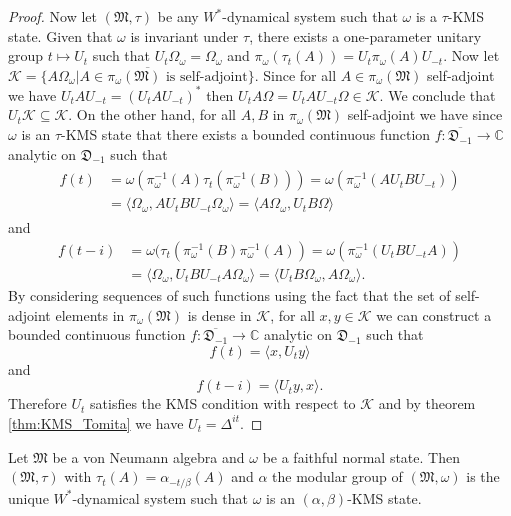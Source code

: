 \begin{proof}
Now let $(\mathfrak{M},\tau)$ be any $W^*$-dynamical system such that $\omega$ is a $\tau$-KMS state. Given that $\omega$ is invariant under $\tau$, there exists a one-parameter unitary group $t\mapsto U_t$ such that $U_t\Omega_\omega=\Omega_\omega$ and $\pi_\omega(\tau_t(A))=U_t\pi_\omega(A)U_{-t}$. Now let $\mathcal{K}=\overline{\{A\Omega_\omega|A\in\pi_\omega(\mathfrak{M})\text{ is self-adjoint}\}}$. Since for all $A\in\pi_\omega(\mathfrak{M})$ self-adjoint we have $U_tAU_{-t}=(U_tAU_{-t})^*$ then $U_tA\Omega=U_tAU_{-t}\Omega\in\mathcal{K}$. We conclude that $U_t\mathcal{K}\subseteq\mathcal{K}$. On the other hand, for all $A,B$ in $\pi_\omega(\mathfrak{M})$ self-adjoint we have since $\omega$ is an $\tau$-KMS state that there exists a bounded continuous function $f:\overline{\mathfrak{D}_{-1}}\rightarrow\mathbb{C}$ analytic on $\mathfrak{D}_{-1}$ such that
\begin{align}
\begin{split}
f(t)&=\omega(\pi_\omega^{-1}(A)\tau_t(\pi_\omega^{-1}(B))) = \omega(\pi_\omega^{-1}(AU_tBU_{-t})) \\
&=\langle\Omega_\omega,AU_tBU_{-t}\Omega_\omega\rangle = \langle A\Omega_\omega,U_tB\Omega\rangle
\end{split}
\end{align}
and
\begin{align}
f(t-i) &=\omega(\tau_t(\pi_\omega^{-1}(B)\pi_\omega^{-1}(A)) = \omega(\pi_\omega^{-1}(U_tBU_{-t}A)) \\
&=\langle \Omega_\omega, U_tBU_{-t}A\Omega_\omega\rangle = \langle U_tB\Omega_\omega, A\Omega_\omega\rangle.
\end{align}
By considering sequences of such functions using the fact that the set of self-adjoint elements in $\pi_\omega(\mathfrak{M})$ is dense in $\mathcal{K}$, for all $x,y\in\mathcal{K}$ we can construct a bounded continuous function $f:\overline{\mathfrak{D}_{-1}}\rightarrow\mathbb{C}$ analytic on $\mathfrak{D}_{-1}$ such that
\begin{equation}
f(t)=\langle x,U_t y\rangle
\end{equation}
and
\begin{equation}
f(t-i) = \langle U_t y,x\rangle.
\end{equation}
Therefore $U_t$ satisfies the KMS condition with respect to $\mathcal{K}$ and by theorem \ref{thm:KMS_Tomita} we have $U_t=\Delta^{it}$.
\end{proof}

\begin{corollary}\label{thm:final}
Let $\mathfrak{M}$ be a von Neumann algebra and $\omega$ be a faithful normal state. Then $(\mathfrak{M},\tau)$ with $\tau_t(A) = \alpha_{-t/\beta}(A)$ and $\alpha$ the modular group of $(\mathfrak{M},\omega)$ is the unique $W^*$-dynamical system such that $\omega$ is an $(\alpha,\beta)$-KMS state.
\end{corollary}

